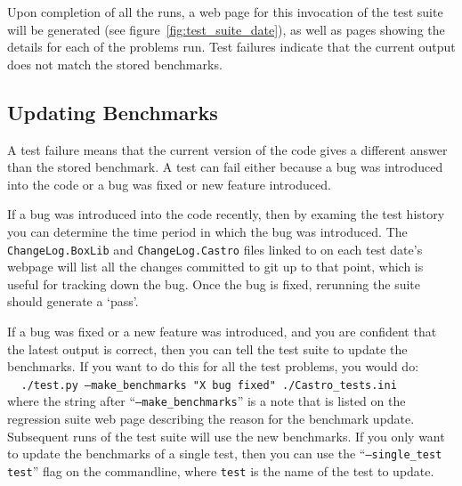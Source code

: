 Upon completion of all the runs, a web page for this invocation of the
test suite will be generated (see figure~\ref{fig:test_suite_date}),
as well as pages showing the details for each of the problems run.
Test failures indicate that the current output does not match the stored
benchmarks.


\subsection{Updating Benchmarks}

A test failure means that the current version of the code gives a
different answer than the stored benchmark.  A test can fail either
because a bug was introduced into the code or a bug was fixed or new
feature introduced.

If a bug was introduced into the code recently, then by examing the
test history you can determine the time period in which the bug was
introduced.  The {\tt ChangeLog.BoxLib} and {\tt ChangeLog.Castro} 
files linked to on each test date's webpage
will list all the changes committed to git up to that point, which is
useful for tracking down the bug.  Once the bug is fixed, rerunning
the suite should generate a `pass'.

If a bug was fixed or a new feature was introduced, and you are
confident that the latest output is correct, then you can tell the
test suite to update the benchmarks.  If you want to do this for all
the test problems, you would do:\\
$~~~~~${\tt ./test.py --make\_benchmarks "X bug fixed" ./Castro\_tests.ini} \\
where the string after ``{\tt --make\_benchmarks}'' is a note that is listed
on the regression suite web page describing the reason for the benchmark
update.  Subsequent runs of the test suite will use the new benchmarks.
If you only want to update the benchmarks of a single test, then you
can use the ``{\tt --single\_test test}'' flag on the commandline, where
{\tt test} is the name of the test to update.

